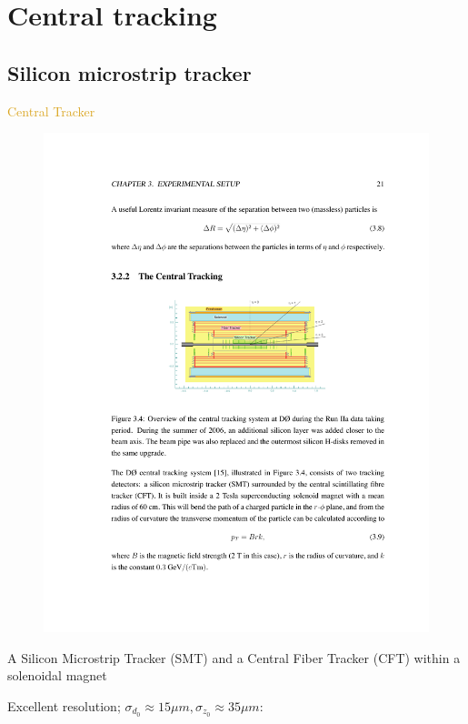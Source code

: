 
\section{Central tracking}

\subsection{Silicon microstrip tracker}

\begin{frame}{\textcolor{Goldenrod}{Central Tracker}}
  \begin{overlayarea}{\textwidth}{\textheight}
    \begin{figure}[h]
      \centering
      \includegraphics[height=0.4\textheight]{./Images/08_CT.pdf}
    \end{figure}
    
    \itt[<+->]
  \item
    A Silicon Microstrip Tracker (SMT) and a Central Fiber Tracker
    (CFT) within a solenoidal magnet
  \item Excellent resolution; $\sigma_{d_0} \approx 15 \mu m, 
    \sigma_{z_0}\approx 35\mu m$:\\
    \tti
  \end{overlayarea}
\end{frame}


